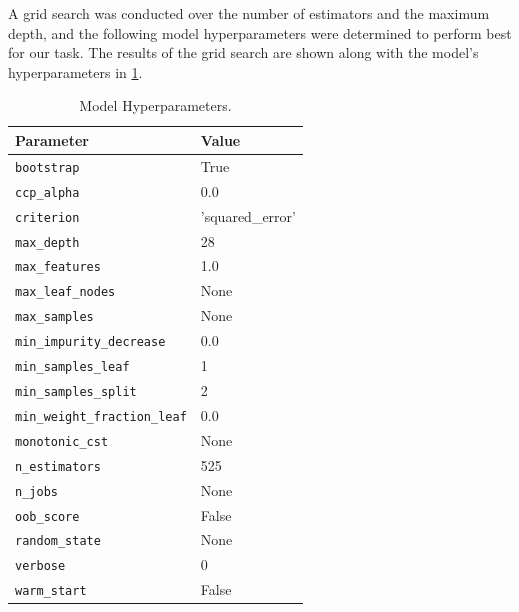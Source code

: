 A grid search was conducted over the number of estimators and the maximum depth, and the following model hyperparameters were determined to perform best for our task. The results of the grid search are shown along with the model's hyperparameters in \cref{tab:model_hyperparameters}.
\par
\begin{table}[h!]
\centering
\renewcommand{\arraystretch}{1.1} %
\setlength{\tabcolsep}{8pt}       %
\begin{tabular}{|l|l|}
\hline
\textbf{Parameter}                 & \textbf{Value}             \\ \hline
\texttt{bootstrap}                 & True                       \\ \hline
\texttt{ccp\_alpha}                & 0.0                        \\ \hline
\texttt{criterion}                 & 'squared\_error'           \\ \hline
\texttt{max\_depth}                & 28                         \\ \hline
\texttt{max\_features}             & 1.0                        \\ \hline
\texttt{max\_leaf\_nodes}          & None                       \\ \hline
\texttt{max\_samples}              & None                       \\ \hline
\texttt{min\_impurity\_decrease}   & 0.0                        \\ \hline
\texttt{min\_samples\_leaf}        & 1                          \\ \hline
\texttt{min\_samples\_split}       & 2                          \\ \hline
\texttt{min\_weight\_fraction\_leaf} & 0.0                      \\ \hline
\texttt{monotonic\_cst}            & None                       \\ \hline
\texttt{n\_estimators}             & 525                        \\ \hline
\texttt{n\_jobs}                   & None                       \\ \hline
\texttt{oob\_score}                & False                      \\ \hline
\texttt{random\_state}             & None                       \\ \hline
\texttt{verbose}                   & 0                          \\ \hline
\texttt{warm\_start}               & False                      \\ \hline
\end{tabular}
\caption{Model Hyperparameters.}
\label{tab:model_hyperparameters}
\end{table}
\par

